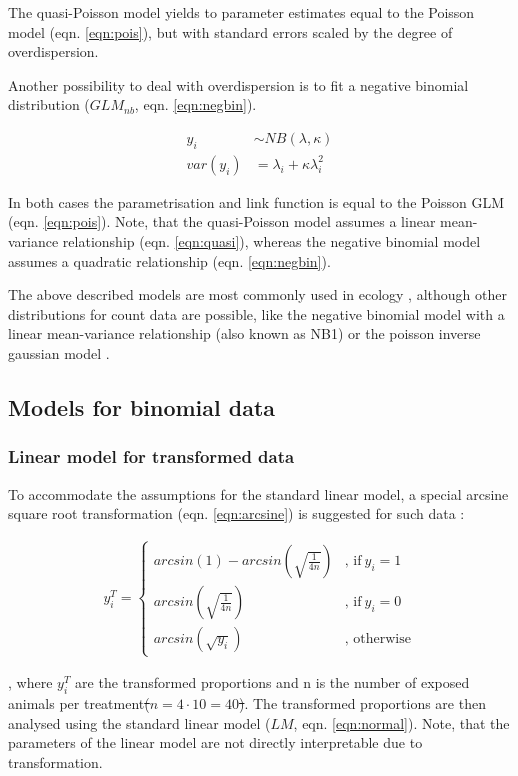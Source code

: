 \documentclass[twocolumn, natbib]{svjour3}
\providecommand{\DIFadd}[1]{{\protect\color{blue}\uwave{#1}}} %
\providecommand{\DIFdel}[1]{{\protect\color{red}\sout{#1}}}                      %
\providecommand{\DIFaddbegin}{} %
\providecommand{\DIFaddend}{} %
\providecommand{\DIFdelbegin}{} %
\providecommand{\DIFdelend}{} %
\begin{document}
The quasi-Poisson model yields to parameter estimates equal to the Poisson model (eqn. \ref{eqn:pois}), but with standard errors scaled by the degree of overdispersion.

Another possibility to deal with overdispersion is to fit a negative binomial distribution ($GLM_{nb}$, eqn. \ref{eqn:negbin}).

\begin{align}
  y_i &\sim NB(\lambda, \kappa) \label{eqn:negbin}  \\
  var(y_i) &= \lambda_i + \kappa \lambda_i^2 \nonumber
\end{align}

In both cases the parametrisation and link function is equal to the Poisson GLM (eqn. \ref{eqn:pois}).
Note, that the quasi-Poisson model assumes a linear mean-variance relationship (eqn. \ref{eqn:quasi}), whereas the negative binomial model assumes a quadratic relationship (eqn. \ref{eqn:negbin}).

The above described models are most commonly used in ecology \citep{ver_hoef_quasi-poisson_2007}, although other distributions for count data are possible, like the negative binomial model with a linear mean-variance relationship (also known as NB1) or the poisson inverse gaussian model \citep{hilbe_modeling_2014}.


\subsection{Models for binomial data}
\subsubsection{Linear model for transformed data}
To accommodate the assumptions for the standard linear model, a special arcsine square root transformation (eqn. \ref{eqn:arcsine}) is suggested for such  data \citep{epa_methods_2002,newman_quantitative_2012}:

\begin{align}
  y_i^T = 
  \begin{cases}  
    arcsin(1) - arcsin(\sqrt{\frac{1}{4n}}) & \text{, if}\ y_i = 1 \\
    arcsin(\sqrt{\frac{1}{4n}}) & \text{, if}\ y_i = 0  \\
    arcsin(\sqrt{y_i}) & \text{, otherwise}
  \end{cases} \label{eqn:arcsine}
\end{align}

, where $y_i^T$ are the transformed proportions and n is the \DIFaddbegin \DIFadd{total }\DIFaddend number of exposed animals per treatment\DIFdelbegin \DIFdel{($n = 4 \cdot 10=40$)}\DIFdelend .
The transformed proportions are then analysed using the standard linear model ($LM$, eqn. \ref{eqn:normal}).
Note, that the parameters of the linear model are not directly interpretable due to transformation.
\end{document}
